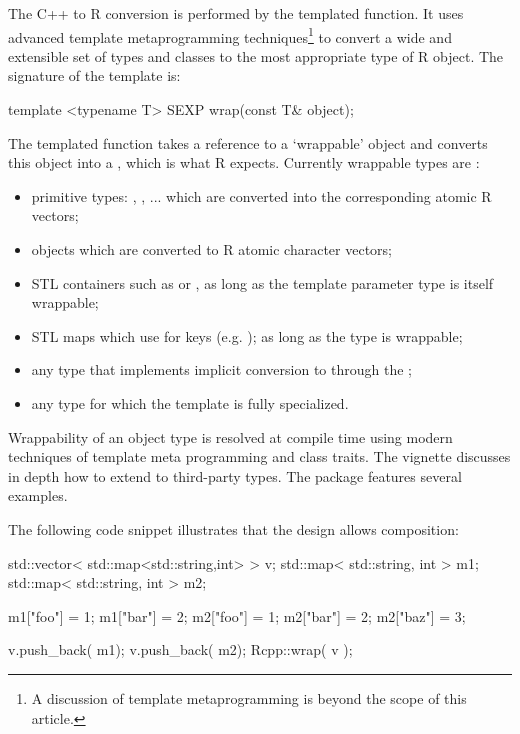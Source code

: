 The C++ to R conversion is performed by the  templated
function. It uses advanced template metaprogramming techniques\footnote{A
  discussion of template metaprogramming
  \citep{Vandevoorde+Josuttis:2003,Abrahams+Gurtovoy:2004} is beyond the
  scope of this article.}  to convert a wide and extensible set of types and
classes to the most appropriate type of R object. The signature of the
 template is:

\begin{example}
template <typename T> 
SEXP wrap(const T& object);
\end{example}

The templated function takes a reference to a `wrappable' 
object and converts this object into a , which is what R expects. 
Currently wrappable types are :
\begin{itemize}
\item primitive types: , , ... which are converted 
into the corresponding atomic R vectors;
\item {} objects which are converted to R atomic character vectors;
\item STL containers such as  or , 
as long as the template parameter type  is itself wrappable;
\item STL maps which use  for keys 
(e.g. ); as long as 
the type  is wrappable;
\item any type that implements implicit conversion to  through the 
;
\item any type for which the  template is
fully specialized.
\end{itemize}

Wrappability of an object type is resolved at compile time using 
modern techniques of template meta programming and class traits. The 
 vignette discusses in depth how to extend 
to third-party types. The  package
\citep*{cran:rcpparmadillo} features several examples.

The following code snippet illustrates that the design allows
composition:

\begin{example}
std::vector< std::map<std::string,int> > v;
std::map< std::string, int > m1;
std::map< std::string, int > m2;

m1["foo"] = 1; m1["bar"] = 2;
m2["foo"] = 1; m2["bar"] = 2; m2["baz"] = 3;

v.push_back( m1);
v.push_back( m2);
Rcpp::wrap( v );
\end{example}

